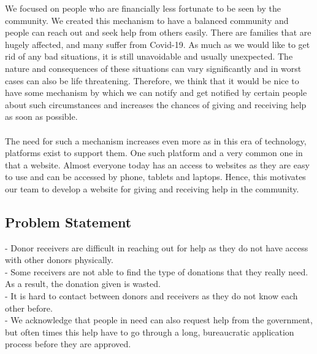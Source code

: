 \documentclass[conference]{IEEEtran}
\begin{document}
    We focused on people who are financially less fortunate  to be seen by the community. We created this mechanism to have a balanced community and people can reach out and seek help from others easily. There are families that are hugely affected, and many suffer from Covid-19. As much as we would like to get rid of any bad situations, it is still unavoidable and usually unexpected. The nature and consequences of these situations can vary significantly and in worst cases can also be life threatening. Therefore, we think that it would be nice to have some mechanism by which we can notify and get notified by certain people about such circumstances and increases the chances of giving and receiving help as soon as possible.
\\ \\
\indent The need for such a mechanism increases even more as in this era of technology, platforms exist to support them. One such platform and a very common one in that a website. Almost everyone today has an access to websites as they are easy to use and can be accessed by phone, tablets and laptops. Hence, this motivates our team to develop a website for giving and receiving help in the community.
\\
    
\subsection{Problem Statement}

-	Donor receivers are difficult in reaching out for help as they do not have access with other donors physically.\\

-	Some receivers are not able to find the type of donations that they really need. As a result, the donation given is wasted.\\

-	It is hard to contact between donors and receivers as they do not know each other before.\\

- 	We acknowledge that people in need can also request help from the government, but often times this help have to go through a long, bureaucratic application process before they are approved.\\
\end{document}
